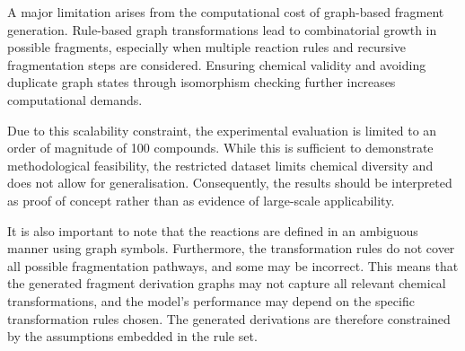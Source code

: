 A major limitation arises from the computational cost of graph-based fragment generation.
Rule-based graph transformations lead to combinatorial growth in possible fragments, \cite[p.~4]{Andersen2013} especially when multiple reaction rules and recursive fragmentation steps are considered.
Ensuring chemical validity and avoiding duplicate graph states through isomorphism checking further increases computational demands. \cite[p.~17]{Andersen2013}

Due to this scalability constraint, the experimental evaluation is limited to an order of magnitude of 100 compounds.
While this is sufficient to demonstrate methodological feasibility, the restricted dataset limits chemical diversity and does not allow for generalisation.
Consequently, the results should be interpreted as proof of concept rather than as evidence of large-scale applicability.

It is also important to note that the reactions are defined in an ambiguous manner using graph symbols.
Furthermore, the transformation rules do not cover all possible fragmentation pathways, and some may be incorrect.
This means that the generated fragment derivation graphs may not capture all relevant chemical transformations, and the model's performance may depend on the specific transformation rules chosen.
The generated derivations are therefore constrained by the assumptions embedded in the rule set.
